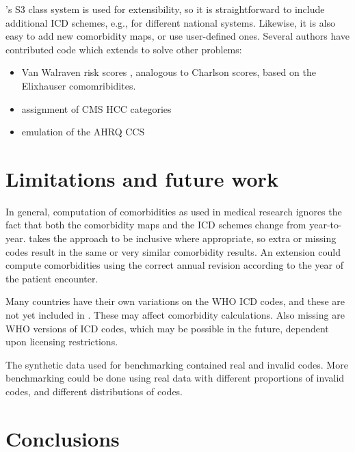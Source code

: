 \documentclass[article]{jss}
\providecommand{\tightlist}{%
  \setlength{\itemsep}{0pt}\setlength{\parskip}{0pt}}
\begin{document}
's S3 class system is used for extensibility, so it is
straightforward to include additional ICD schemes, e.g., for different
national systems. Likewise, it is also easy to add new comorbidity maps,
or use user-defined ones. Several authors have contributed code which
extends  to solve other problems:

\begin{itemize}
\tightlist
\item
  Van Walraven risk scores
  \citep{vanWalraven_modificationElixhausercomorbidity_2009}, analogous
  to Charlson scores, based on the Elixhauser comomribidites.
\item
  assignment of CMS HCC categories
  \citep{Evans_EvaluationCMSHCCRisk_2011, Pope_RiskadjustmentMedicare_2004}
\item
  emulation of the AHRQ CCS
  \citep{AgencyforHealthcareResearchandQuality_ClinicalClassificationsSoftware_2012}
\end{itemize}

\hypertarget{limitations-and-future-work}{%
\section{Limitations and future
work}\label{limitations-and-future-work}}

In general, computation of comorbidities as used in medical research
ignores the fact that both the comorbidity maps and the ICD schemes
change from year-to-year.  takes the approach to be inclusive
where appropriate, so extra or missing codes result in the same or very
similar comorbidity results. An extension could compute comorbidities
using the correct annual revision according to the year of the patient
encounter.

Many countries have their own variations on the WHO ICD codes, and these
are not yet included in . These may affect comorbidity
calculations. Also missing are WHO versions of ICD codes, which may be
possible in the future, dependent upon licensing restrictions.

The synthetic data used for benchmarking contained real and invalid
codes. More benchmarking could be done using real data with different
proportions of invalid codes, and different distributions of codes.

\hypertarget{conclusions}{%
\section{Conclusions}\label{conclusions}}
\end{document}
